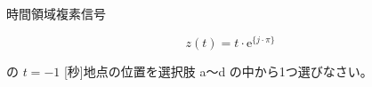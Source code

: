 時間領域複素信号 

\[
z(t) = t \cdot \textrm{e}^{\{j \cdot \pi \}}
\]

\medskip
\noindent の $t = -1$ [秒]地点の位置を選択肢 a〜d の中から1つ選びなさい。
